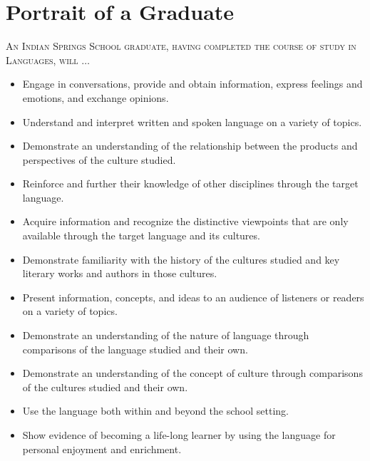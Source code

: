 \section{Portrait of a Graduate}

\textsc{An Indian Springs School graduate, having completed the course of study in Languages, will} $\ldots$ 

\begin{itemize}
  \item Engage in conversations, provide and obtain information, express feelings and emotions, and exchange opinions.
\item Understand and interpret written and spoken language on a variety of topics.
\item Demonstrate an understanding of the relationship between the products and perspectives of the culture studied.
\item Reinforce and further their knowledge of other disciplines through the target language.
\item Acquire information and recognize the distinctive viewpoints that are only available through the target language and its cultures.
\item Demonstrate familiarity with the history of the cultures studied and key literary works and authors in those cultures. 
\item Present information, concepts, and ideas to an audience of listeners or readers on a variety of topics.
\item Demonstrate an understanding of the nature of language through comparisons of the language studied and their own.
\item Demonstrate an understanding of the concept of culture through comparisons of the cultures studied and their own.
\item Use the language both within and beyond the school setting.
\item Show evidence of becoming a life-long learner by using the language for personal enjoyment and enrichment.

\end{itemize}